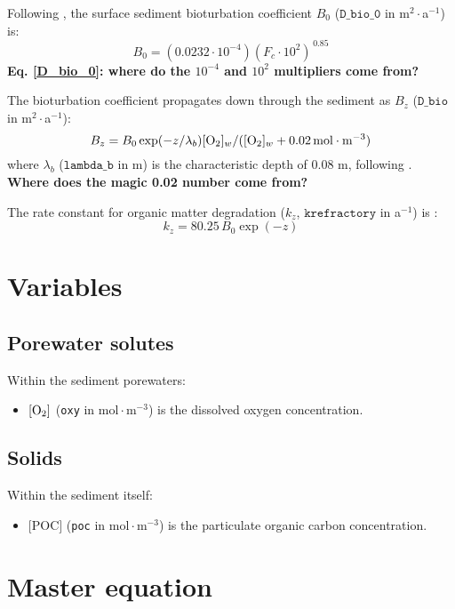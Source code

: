 \documentclass[a4paper]{article}
\newcommand{\code}[1]{\texttt{#1}}
\newcommand{\molmmm}{\mathrm{mol}\cdot\mathrm{m}^{-3}}
\newcommand{\wtf}[1]{\textcolor{Cerulean}{\textbf{#1}}}
\begin{document}
Following \citet{archer_model_2002}, the surface sediment bioturbation coefficient $B_0$ ($\code{D\_bio\_0}$ in m$^2\cdot$a$^{-1}$) is:
\begin{equation}\label{D_bio_0}
B_0 = (0.0232 \cdot 10^{-4}) (F_c \cdot 10^2)^{\,0.85}
\end{equation}
\wtf{Eq. \eqref{D_bio_0}: where do the $10^{-4}$ and $10^2$ multipliers come from?}

The bioturbation coefficient propagates down through the sediment as $B_z$ ($\code{D\_bio}$ in m$^2\cdot$a$^{-1}$):
\begin{equation}\label{B_z}
B_z = B_0 \exp(-z/\lambda_b) [\ce{O2}]_w / ([\ce{O2}]_w + 0.02 \, \molmmm)
\end{equation}
where $\lambda_b$ ($\code{lambda\_b}$ in m) is the characteristic depth of 0.08 m, following \citet{sayles_benthic_2001}. \wtf{Where does the magic 0.02 number come from?}

The rate constant for organic matter degradation ($k_z$, $\code{krefractory}$ in a$^{-1}$) is \citep{archer_model_2002}:
\begin{equation}\label{k_poc_degradation}
k_z = 80.25 \, B_0 \exp(-z)
\end{equation}

\section{Variables}

\subsection{Porewater solutes}

Within the sediment porewaters:
\begin{itemize}
  \item $[\ce{O2}]$ (\code{oxy} in $\molmmm$) is the dissolved oxygen concentration.
\end{itemize}

\subsection{Solids}

Within the sediment itself:
\begin{itemize}
  \item $[$POC$]$ (\code{poc} in $\molmmm$) is the particulate organic carbon concentration.
\end{itemize}

\section{Master equation}
\end{document}
